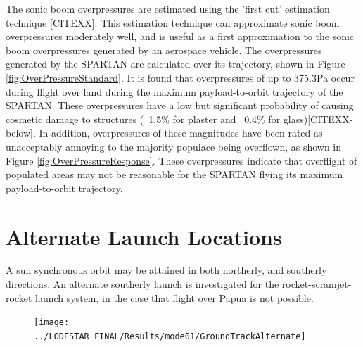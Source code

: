 The sonic boom overpressures are estimated using the 'first cut' estimation technique [CITEXX]. This estimation technique can approximate sonic boom overpressures moderately well, and is useful as a first approximation to the sonic boom overpressures generated by an aerospace vehicle. The overpressures generated by the SPARTAN are calculated over its trajectory, shown in Figure \ref{fig:OverPressureStandard}. It is found that overpressures of up to 375.3Pa occur during flight over land during the maximum payload-to-orbit trajectory of the SPARTAN. These overpressures have a low but significant probability of causing cosmetic damage to structures (~1.5\% for plaster and ~0.4\% for glass)[CITEXX-below]. In addition, overpressures of these magnitudes have been rated as unacceptably annoying to the majority populace being overflown, as shown in Figure \ref{fig:OverPressureResponse}. 
These overpressures indicate that overflight of populated areas may not be reasonable for the SPARTAN flying its maximum payload-to-orbit trajectory. 







\section{Alternate Launch Locations}

A sun synchronous orbit may be attained in both northerly, and southerly directions. An alternate southerly launch is investigated for the rocket-scramjet-rocket launch system, in the case that flight over Papua is not possible. 


\begin{figure}[th]
	\centering
	\texttt{[image: ../LODESTAR\_FINAL/Results/mode01/GroundTrackAlternate]}
	\caption{}
	\label{fig:GroundTrackAlternate}
\end{figure}

